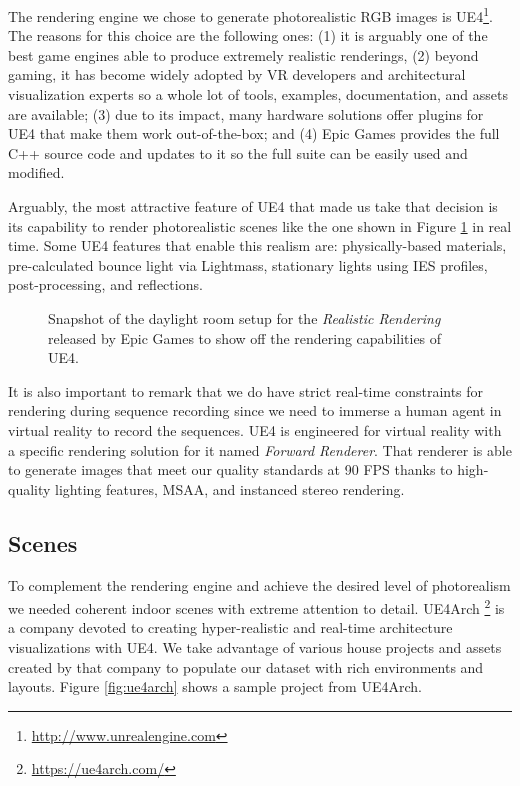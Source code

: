 The rendering engine we chose to generate photorealistic RGB images is \acf{UE4}\footnote{\url{http://www.unrealengine.com}}. The reasons for this choice are the following ones: (1) it is arguably one of the best game engines able to produce extremely realistic renderings, (2) beyond gaming, it has become widely adopted by VR developers and architectural visualization experts so a whole lot of tools, examples, documentation, and assets are available; (3) due to its impact, many hardware solutions offer plugins for \ac{UE4} that make them work out-of-the-box; and (4) Epic Games provides the full C++ source code and updates to it so the full suite can be easily used and modified.

Arguably, the most attractive feature of \ac{UE4} that made us take that decision is its capability to render photorealistic scenes like the one shown in Figure \ref{fig:realistic_rendering} in real time. Some \ac{UE4} features that enable this realism are: physically-based materials, pre-calculated bounce light via Lightmass, stationary lights using IES profiles, post-processing, and reflections.

\begin{figure}[!hbt]
  \centering
  \caption{Snapshot of the daylight room setup for the \emph{Realistic Rendering} released by Epic Games to show off the rendering capabilities of \ac{UE4}.}
  \label{fig:realistic_rendering}
\end{figure}

It is also important to remark that we do have strict real-time constraints for rendering during sequence recording since we need to immerse a human agent in virtual reality to record the sequences. \ac{UE4} is engineered for virtual reality with a specific rendering solution for it named \emph{Forward Renderer}. That renderer is able to generate images that meet our quality standards at 90 \ac{FPS} thanks to high-quality lighting features, \ac{MSAA}, and instanced stereo rendering.

\subsection{Scenes}

To complement the rendering engine and achieve the desired level of photorealism we needed coherent indoor scenes with extreme attention to detail. UE4Arch \footnote{\url{https://ue4arch.com/}} is a company devoted to creating hyper-realistic and real-time architecture visualizations with \ac{UE4}. We take advantage of various house projects and assets created by that company to populate our dataset with rich environments and layouts. Figure \ref{fig:ue4arch} shows a sample project from UE4Arch.

